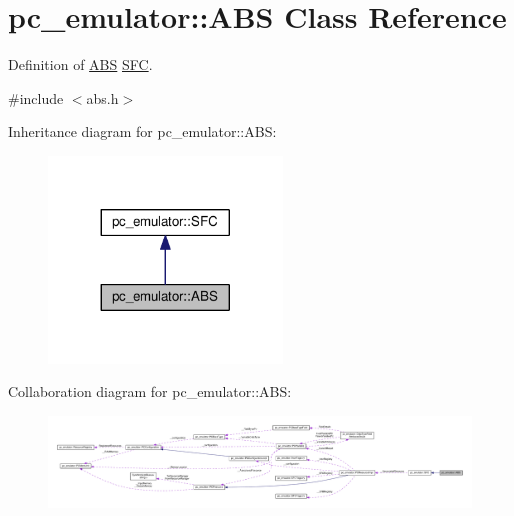 \hypertarget{classpc__emulator_1_1ABS}{}\section{pc\+\_\+emulator\+:\+:A\+BS Class Reference}
\label{classpc__emulator_1_1ABS}


Definition of \hyperlink{classpc__emulator_1_1ABS}{A\+BS} \hyperlink{classpc__emulator_1_1SFC}{S\+FC}.  




{\ttfamily \#include $<$abs.\+h$>$}



Inheritance diagram for pc\+\_\+emulator\+:\+:A\+BS\+:\nopagebreak
\begin{figure}[H]
\begin{center}
\leavevmode
\includegraphics[width=176pt]{classpc__emulator_1_1ABS__inherit__graph}
\end{center}
\end{figure}


Collaboration diagram for pc\+\_\+emulator\+:\+:A\+BS\+:\nopagebreak
\begin{figure}[H]
\begin{center}
\leavevmode
\includegraphics[width=350pt]{classpc__emulator_1_1ABS__coll__graph}
\end{center}
\end{figure}
